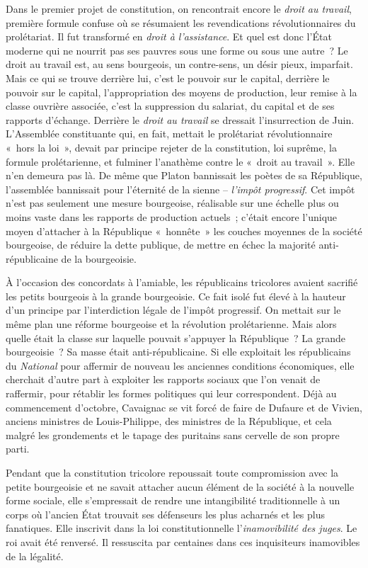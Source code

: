 \documentclass[french,twoside]{book} %
\begin{document}
Dans le premier projet de constitution, on rencontrait encore le \emph{droit au travail}, première formule confuse où se résumaient les revendications révolutionnaires du prolétariat. Il fut transformé en \emph{droit à l’assistance}. Et quel est donc l’État moderne qui ne nourrit pas ses pauvres sous une forme ou sous une autre ? Le droit au travail est, au sens bourgeois, un contre-sens, un désir pieux, imparfait. Mais ce qui se trouve derrière lui, c’est le pouvoir sur le capital, derrière le pouvoir sur le capital, l’appropriation des moyens de production, leur remise à la classe ouvrière associée, c’est la suppression du salariat, du capital et de ses rapports d’échange. Derrière le \emph{droit au travail} se dressait l’insurrection de Juin. L’Assemblée constituante qui, en fait, mettait le prolétariat révolutionnaire « hors la loi », devait par principe rejeter de la constitution, loi suprême, la formule prolétarienne, et fulminer l’anathème contre le « droit au travail ». Elle n’en demeura pas là. De même que Platon bannissait les poètes de sa République, l’assemblée bannissait pour l’éternité de la sienne – \emph{l’impôt progressif}. Cet impôt n’est pas seulement une mesure bourgeoise, réalisable sur une échelle plus ou moins vaste dans les rapports de production actuels ; c’était encore l’unique moyen d’attacher à la République « honnête » les couches moyennes de la société bourgeoise, de réduire la dette publique, de mettre en échec la majorité anti-républicaine de la bourgeoisie.\par
À l’occasion des concordats à l’amiable, les républicains tricolores avaient sacrifié les petits bourgeois à la grande bourgeoisie. Ce fait isolé fut élevé à la hauteur d’un principe par l’interdiction légale de l’impôt progressif. On mettait sur le même plan une réforme bourgeoise et la révolution prolétarienne. Mais alors quelle était la classe sur laquelle pouvait s’appuyer la République ? La grande bourgeoisie ? Sa masse était anti-républicaine. Si elle exploitait les républicains du \emph{National} pour affermir de nouveau les anciennes conditions économiques, elle cherchait d’autre part à exploiter les rapports sociaux que l’on venait de raffermir, pour rétablir les formes politiques qui leur correspondent. Déjà au commencement d’octobre, Cavaignac se vit forcé de faire de Dufaure et de Vivien, anciens ministres de Louis-Philippe, des ministres de la République, et cela malgré les grondements et le tapage des puritains sans cervelle de son propre parti.\par
Pendant que la constitution tricolore repoussait toute compromission avec la petite bourgeoisie et ne savait attacher aucun élément de la société à la nouvelle forme sociale, elle s’empressait de rendre une intangibilité traditionnelle à un corps où l’ancien État trouvait ses défenseurs les plus acharnés et les plus fanatiques. Elle inscrivit dans la loi constitutionnelle l’\emph{inamovibilité des juges}. Le roi avait été renversé. Il ressuscita par centaines dans ces inquisiteurs inamovibles de la légalité.\par
\end{document}
